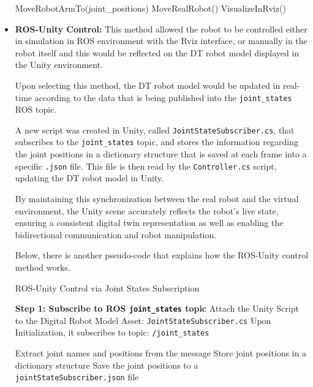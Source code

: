 \begin{itemize}
\begin{algorithm}
\begin{algorithmic}[1]
                \State MoveRobotArmTo(joint\_positions)
                    \State MoveRealRobot()
                \Else
                    \State VisualizeInRviz()
                \EndIf
            \EndWhile
        \end{algorithmic}
    \end{algorithm}
    
        

    \item \textbf{ROS-Unity Control:} This method allowed the robot to be controlled either in simulation in ROS environment with the Rviz interface, or manually in the robot itself and this would be reflected on the \ac{DT} robot model displayed in the Unity environment.

    Upon selecting this method, the \ac{DT} robot model would be updated in real-time according to the data that is being published into the \texttt{joint\_states} ROS topic.
    
    A new script was created in Unity, called \texttt{JointStateSubscriber.cs}, that subscribes to the \texttt{joint\_states} topic, and stores the information regarding the joint positions in a dictionary structure that is saved at each frame into a specific \texttt{.json} file. This file is then read by the \texttt{Controller.cs} script, updating the \ac{DT} robot model in Unity.
    
    By maintaining this synchronization between the real robot and the virtual environment, the Unity scene accurately reflects the robot's live state, ensuring a consistent digital twin representation as well as enabling the bidirectional communication and robot manipulation.

    Below, there is another pseudo-code that explains how the ROS-Unity control method works.
    \begin{algorithm}
        \caption{ROS-Unity Control via Joint States Subscription}\label{alg:ros_unity_control}
        \begin{algorithmic}[1]
            \State \textbf{Step 1: Subscribe to ROS \texttt{joint\_states} topic}
            \State Attach the Unity Script to the Digital Robot Model Asset: \texttt{JointStateSubscriber.cs}
            \State Upon Initialization, it subscribes to topic: \texttt{/joint\_states}
    
                \State Extract joint names and positions from the message
                \State Store joint positions in a dictionary structure
                \State Save the joint positions to a \texttt{jointStateSubscriber.json} file
            \EndWhile
    

\end{algorithmic}
\end{algorithm}
\end{itemize}
